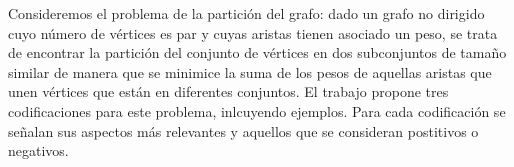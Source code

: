 Consideremos el problema de la partición del grafo: dado un grafo no dirigido cuyo número de vértices es par y cuyas aristas tienen asociado un peso, se trata de encontrar la partición del conjunto de vértices en dos subconjuntos de tamaño similar de manera que se minimice la suma de los pesos de aquellas aristas que unen vértices que están en diferentes conjuntos. El trabajo propone tres codificaciones para este problema, inlcuyendo ejemplos. Para cada codificación se señalan sus aspectos más relevantes y aquellos que se consideran postitivos o negativos.